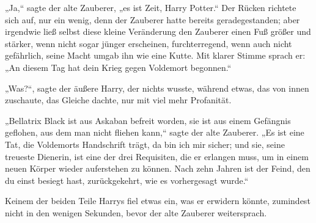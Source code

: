 „Ja,“ sagte der alte Zauberer, „es ist Zeit, Harry Potter.“ Der Rücken richtete sich auf, nur ein wenig, denn der Zauberer hatte bereits geradegestanden; aber irgendwie ließ selbst diese kleine Veränderung den Zauberer einen Fuß größer und stärker, wenn nicht sogar jünger erscheinen, furchterregend, wenn auch nicht gefährlich, seine Macht umgab ihn wie eine Kutte. Mit klarer Stimme sprach er: „An diesem Tag hat dein Krieg gegen Voldemort begonnen.“

„Was?“, sagte der äußere Harry, der nichts wusste, während etwas, das von innen zuschaute, das Gleiche dachte, nur mit viel mehr Profanität.

„Bellatrix Black ist aus Askaban befreit worden, sie ist aus einem Gefängnis geflohen, aus dem man nicht fliehen kann,“ sagte der alte Zauberer. „Es ist eine Tat, die Voldemorts Handschrift trägt, da bin ich mir sicher; und sie, seine treueste Dienerin, ist eine der drei Requisiten, die er erlangen muss, um in einem neuen Körper wieder auferstehen zu können. Nach zehn Jahren ist der Feind, den du einst besiegt hast, zurückgekehrt, wie es vorhergesagt wurde.“

Keinem der beiden Teile Harrys fiel etwas ein, was er erwidern könnte, zumindest nicht in den wenigen Sekunden, bevor der alte Zauberer weitersprach.

